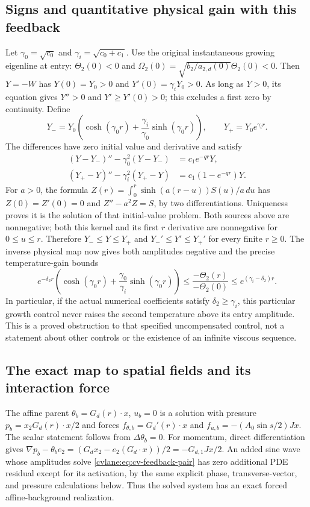 \subsection{Signs and quantitative physical gain with this feedback}

Let $\gamma_0=\sqrt{c_0}$ and $\gamma_i=\sqrt{c_0+c_1}$.
Use the original instantaneous growing eigenline at entry:
$\Theta_2(0)<0$ and
$\Omega_2(0)=\sqrt{b_2/a_{2,d}(0)}\Theta_2(0)<0$.
Then $Y=-W$ has $Y(0)=Y_0>0$ and
$Y'(0)=\gamma_iY_0>0$.
As long as $Y>0$, its equation gives $Y''>0$ and
$Y'\geq Y'(0)>0$; this excludes a first zero by continuity.
Define
\[
 Y_-=Y_0\left(\cosh(\gamma_0r)
          +\frac{\gamma_i}{\gamma_0}\sinh(\gamma_0r)\right),
 \qquad Y_+=Y_0e^{\gamma_i r}.
\]
The differences have zero initial value and derivative and satisfy
\begin{align*}
 (Y-Y_-)''-\gamma_0^2(Y-Y_-)&=c_1e^{-qr}Y,\\
 (Y_+-Y)''-\gamma_i^2(Y_+-Y)&=c_1(1-e^{-qr})Y.
\end{align*}
For $a>0$, the formula
$Z(r)=\int_0^r\sinh(a(r-u))S(u)/a\,du$ has
$Z(0)=Z'(0)=0$ and $Z''-a^2Z=S$, by two differentiations.
Uniqueness proves it is the solution of that initial-value problem.
Both sources above are nonnegative; both this kernel and its first
$r$ derivative are nonnegative for $0\leq u\leq r$.
Therefore $Y_-\leq Y\leq Y_+$ and
$Y_-'\leq Y'\leq Y_+'$ for every finite $r\geq0$.
The inverse physical map now gives both amplitudes negative and the
precise temperature-gain bounds
\begin{equation}
 e^{-\delta_2r}\left(\cosh(\gamma_0r)
       +\frac{\gamma_0}{\gamma_i}\sinh(\gamma_0r)\right)
 \leq\frac{-\Theta_2(r)}{-\Theta_2(0)}
 \leq e^{(\gamma_i-\delta_2)r}.
 \label{cvlane:eq:cv-feedback-physical-gain}
\end{equation}
In particular, if the actual numerical coefficients satisfy
$\delta_2\geq\gamma_i$, this particular growth control never raises
the second temperature above its entry amplitude. This is a proved
obstruction to that specified uncompensated control, not a statement
about other controls or the existence of an infinite viscous sequence.

\subsection{The exact map to spatial fields and its interaction force}

The affine parent $\theta_b=G_d(r)\cdot x$, $u_b=0$ is a solution
with pressure $p_b=x_2G_d(r)\cdot x/2$ and forces
$f_{\theta,b}=G_d'(r)\cdot x$ and
$f_{u,b}=-(A_0\sin s/2)Jx$.
The scalar statement follows from $\Delta\theta_b=0$.
For momentum, direct differentiation gives
$\nabla p_b-\theta_be_2=(G_dx_2-e_2(G_d\cdot x))/2
=-G_{d,1}Jx/2$.
An added sine wave whose amplitudes solve
\eqref{cvlane:eq:cv-feedback-pair} has zero additional PDE residual except
for its activation, by the same explicit phase, transverse-vector,
and pressure calculations below. Thus the solved system has an exact
forced affine-background realization.

